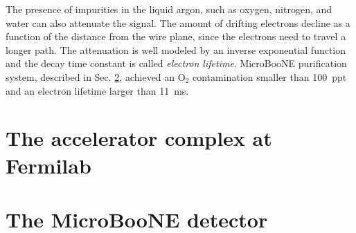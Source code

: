 The presence of impurities in the liquid argon, such as oxygen, nitrogen, and water can also attenuate the signal. The amount of drifting electrons decline as a function of the distance from the wire plane, since the electrons need to travel a longer path. The attenuation is well modeled by an inverse exponential function and the decay time constant is called \emph{electron lifetime}. MicroBooNE purification system, described in Sec. \ref{sec:detector}, achieved an O$_2$ contamination smaller than 100~ppt and an electron lifetime larger than 11~ms.


\section{The accelerator complex at Fermilab}

\section{The MicroBooNE detector}\label{sec:detector}

